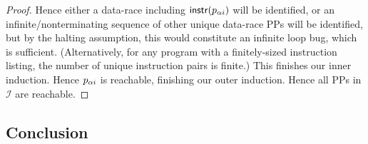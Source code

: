 \begin{proof}
Hence either a data-race including $\mathsf{instr}(p_{\alpha{}i})$ will be identified,
or an infinite/nonterminating sequence of other unique data-race PPs will be identified,
but by the halting assumption, this would constitute an infinite loop bug, which is sufficient.
(Alternatively, for any program with a finitely-sized instruction listing, the number of unique instruction pairs is finite.)
This finishes our inner induction.
Hence $p_{\alpha{}i}$ is reachable, finishing our outer induction.
Hence all PPs in $\mathcal{I}$ are reachable.
\end{proof}

%
%


\subsection{Conclusion}

